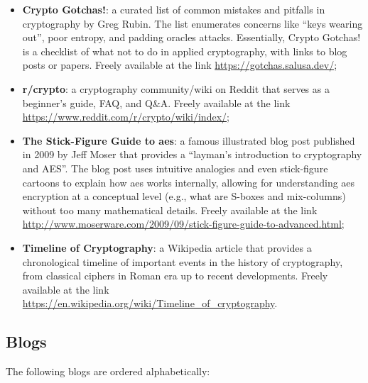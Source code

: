 \begin{itemize}
	\item \textbf{Crypto Gotchas!}: a curated list of common mistakes and pitfalls in cryptography by Greg Rubin. The list enumerates concerns like ``keys wearing out'', poor entropy, and padding oracles attacks. Essentially, Crypto Gotchas! is a checklist of what not to do in applied cryptography, with links to blog posts or papers. Freely available at the link \url{https://gotchas.salusa.dev/};
	
	\item \textbf{r/crypto}: a cryptography community/wiki on Reddit that serves as a beginner's guide, FAQ, and Q\&A. Freely available at the link \url{https://www.reddit.com/r/crypto/wiki/index/};
	
	\item \textbf{The Stick-Figure Guide to \gls{aes}}: a famous illustrated blog post published in 2009 by Jeff Moser that provides a ``layman's introduction to cryptography and AES''. The blog post uses intuitive analogies and even stick-figure cartoons to explain how \gls{aes} works internally, allowing for understanding \gls{aes} encryption at a conceptual level (e.g., what are S-boxes and mix-columns) without too many mathematical details. Freely available at the link \url{http://www.moserware.com/2009/09/stick-figure-guide-to-advanced.html};
	
	\item \textbf{Timeline of Cryptography}: a Wikipedia article that provides a chronological timeline of important events in the history of cryptography, from classical ciphers in Roman era up to recent developments. Freely available at the link \url{https://en.wikipedia.org/wiki/Timeline_of_cryptography}.
\end{itemize}

	
\subsection{Blogs}\label{sec:appendix:further_resources:blogs}

The following blogs are ordered alphabetically:

